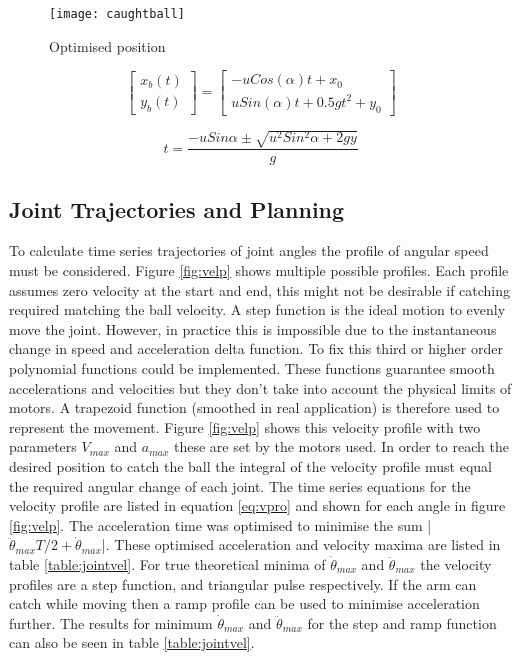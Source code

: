 \documentclass[twoside,twocolumn]{article}
\begin{document}
\begin{figure}[h]
  \centering
    \texttt{[image: caughtball]}
  \caption{Optimised position}
  \label{fig:caught}
\end{figure}

\begin{equation}
\begin{bmatrix}
x_b(t) \\
y_b(t)
\end{bmatrix}
=
\begin{bmatrix}
-uCos(\alpha)t+x_0\\
uSin(\alpha)t+0.5gt^2+y_0
\end{bmatrix}
\label{eq:balldyn}
\end{equation}

\begin{equation}
t= \frac{-uSin\alpha \pm \sqrt{u^2Sin^2\alpha+2gy}}{g}
\label{eq:balltime}
\end{equation}

\subsection{Joint Trajectories and Planning}
To calculate time series trajectories of joint angles the profile of angular speed must be considered. Figure \ref{fig:velp} shows multiple possible profiles. Each profile assumes zero velocity at the start and end, this might not be desirable if catching required matching the ball velocity. A step function is the ideal motion to evenly move the joint. However, in practice this is impossible due to the instantaneous change in speed and acceleration delta function. To fix this third or higher order polynomial functions could be implemented. These functions guarantee smooth accelerations and velocities but they don't take into account the physical limits of motors. A trapezoid function (smoothed in real application) is therefore used to represent the movement. Figure \ref{fig:velp} shows this velocity profile with two parameters $V_{max}$ and $a_{max}$ these are set by the motors used. In order to reach the desired position to catch the ball the integral of the velocity profile must equal the required angular change of each joint.
\newline
The time series equations for the velocity profile are listed in equation \ref{eq:vpro} and shown for each angle in figure \ref{fig:velp}. The acceleration time was optimised to minimise the sum |$\ddot{\theta}_{max}T/2+\dot{\theta}_{max}$|. These optimised acceleration and velocity maxima are listed in table \ref{table:jointvel}. For true theoretical minima of $\dot{\theta}_{max}$ and $\ddot{\theta}_{max}$ the velocity profiles are a step function, and triangular pulse respectively. If the arm can catch while moving then a ramp profile can be used to minimise acceleration further. The results for minimum $\dot{\theta}_{max}$ and $\ddot{\theta}_{max}$ for the step and ramp function can also be seen in table \ref{table:jointvel}.
\end{document}

